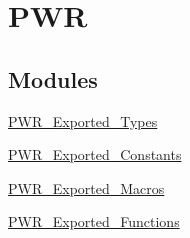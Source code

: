 \hypertarget{group__PWR}{
\section{PWR}
\label{group__PWR}
}
\subsection*{Modules}
\begin{DoxyCompactItemize}
\item 
\hyperlink{group__PWR__Exported__Types}{PWR\_\-Exported\_\-Types}
\item 
\hyperlink{group__PWR__Exported__Constants}{PWR\_\-Exported\_\-Constants}
\item 
\hyperlink{group__PWR__Exported__Macros}{PWR\_\-Exported\_\-Macros}
\item 
\hyperlink{group__PWR__Exported__Functions}{PWR\_\-Exported\_\-Functions}
\end{DoxyCompactItemize}
